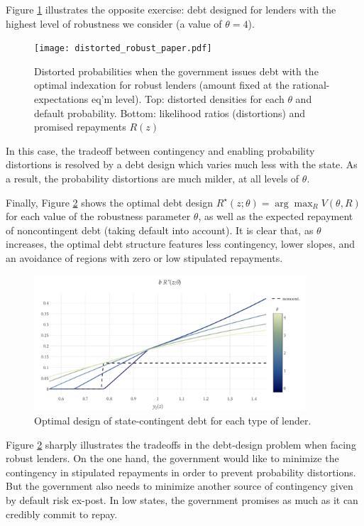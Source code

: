 Figure \ref{Figure_distorted_robust} illustrates the opposite exercise: debt designed for lenders with the highest level of robustness we consider (a value of $\theta = 4$).
\begin{figure}[!hbtp]\centering
    \texttt{[image: distorted\_robust\_paper.pdf]}
\caption{Distorted probabilities when the government issues debt with the optimal indexation for robust lenders (amount fixed at the rational-expectations eq'm level). Top: distorted densities for each $\theta$ and default probability. Bottom: likelihood ratios (distortions) and promised repayments $R(z)$
\label{Figure_distorted_robust}}
\end{figure}
In this case, the tradeoff between contingency and enabling probability distortions is resolved by a debt design which varies much less with the state. As a result, the probability distortions are much milder, at all levels of $\theta$.

Finally, Figure \ref{Figure_arrow} shows the optimal debt design $R^\star(z;\theta) = \arg\max_R V(\theta,R)$ for each value of the robustness parameter $\theta$, as well as the expected repayment of noncontingent debt (taking default into account). It is clear that, as $\theta$ increases, the optimal debt structure features less contingency, lower slopes, and an avoidance of regions with zero or low stipulated repayments.
\begin{figure}[!hbtp]\centering
    \includegraphics[width=0.9\textwidth]{arrow_paper.pdf}
\caption{Optimal design of state-contingent debt for each type of lender.
\label{Figure_arrow}}
\end{figure}
Figure \ref{Figure_arrow} sharply illustrates the tradeoffs in the debt-design problem when facing robust lenders. On the one hand, the government would like to minimize the contingency in stipulated repayments in order to prevent probability distortions. But the government also needs to minimize another source of contingency given by default risk ex-post. In low states, the government promises as much as it can credibly commit to repay.

